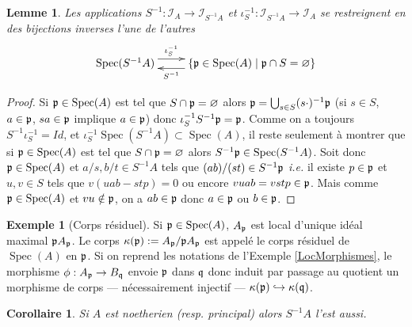 \documentclass[a4paper, oneside, 12pt]{book}
\theoremstyle{theoremeStyle} %
\newtheorem{lemme}[theoreme]{Lemme}
\newtheorem{corollaire}[theoreme]{Corollaire}
\theoremstyle{definition} %
\newtheorem{exemple}[theoreme]{Exemple}
\newcommand{\ie}{\textit{i.e.}} %
\DeclareMathOperator{\Spec}{Spec}
\begin{document}
\begin{lemme}Les applications $S^{-1}: \mathcal{I}_A \rightarrow  \mathcal{I}_{S^{-1}A}  $ et  $\iota_S^{-1}: \mathcal{I}_{S^{-1}A} \rightarrow \mathcal{I}_A $ se restreignent en des bijections inverses l'une de l'autres
$$\xymatrix{\Spec(S^{-1}A) \ar@<1ex>[r]^-{\iota_S^{-1}}& \lbrace \frak{p}\in \Spec(A)\;|\; \frak{p}\cap S=\varnothing\rbrace \ar@<1ex>[l]^-{S^{-1}} }$$\end{lemme}
\begin{proof} Si $\frak{p}\in \Spec(A)$ est tel que $S\cap \frak{p}=\varnothing$ alors $\frak{p}=\bigcup_{s\in S}(s\cdot)^{-1}\frak{p}$ (si $s\in S$, $a\in \frak{p}$, $sa\in\frak{p}$ implique $a\in\frak{p}$) donc   $\iota_S^{-1}S^{-1}\frak{p}=\frak{p}$. Comme on a toujours $S^{-1}\iota_S^{-1}=Id$, et $\iota_S^{-1}\Spec(S^{-1}A)\subset \Spec(A)$, il reste seulement à montrer que si $\frak{p}\in \Spec(A)$ est tel que $S\cap \frak{p}=\varnothing$ alors  $S^{-1}\frak{p}\in \Spec(S^{-1}A)$. Soit donc $\frak{p}\in \Spec(A)$ et $a/s,b/t\in S^{-1}A$ tels que $(ab)/(st)\in S^{-1}\frak{p}$ \ie{} il existe $p\in \frak{p}$ et $u,v\in S$ tels que $v(uab-stp)=0$ ou encore $vuab=vstp\in\frak{p}$. Mais comme $\frak{p}\in \Spec(A)$ et $vu\notin\frak{p}$, on a $ab\in\frak{p}$ donc $a\in\frak{p}$ ou $b\in\frak{p}$.   \end{proof}

	\begin{exemple}[Corps résiduel] Si $\frak{p}\in \Spec(A)$,  $A_{\frak{p}}$ est local d'unique idéal maximal $\frak{p}A_{\frak{p}}$. Le corps $\kappa(\frak{p}):=A_{\frak{p}}/\frak{p}A_{\frak{p}}$ est appelé le corps résiduel de $\Spec(A)$ en $\frak{p}$. Si on reprend les notations de l'Exemple \ref{LocMorphismes}, le morphisme $\phi:A_{\frak{p}}\rightarrow B_{\frak{q}}$ envoie $\frak{p}$ dans $\frak{q}$ donc induit par passage au quotient un morphisme de corps --- nécessairement injectif --- $\kappa(\frak{p})\hookrightarrow \kappa(\frak{q})$.\end{exemple}


	\begin{corollaire}Si $A$ est noetherien (resp. principal) alors $S^{-1}A$ l'est aussi.\end{corollaire}
\end{document}
